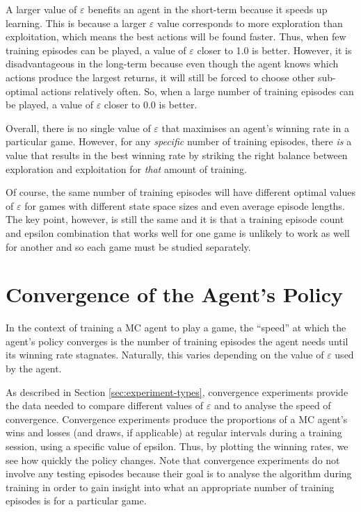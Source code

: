\documentclass[11pt,a4paper]{report}
\begin{document}
A larger value of $\varepsilon$ benefits an agent in the short-term because it speeds up learning. This is because a larger $\varepsilon$ value corresponds to more exploration than exploitation, which means the best actions will be found faster. Thus, when few training episodes can be played, a value of $\varepsilon$ closer to 1.0 is better. However, it is disadvantageous in the long-term because even though the agent knows which actions produce the largest returns, it will still be forced to choose other sub-optimal actions relatively often. So, when a large number of training episodes can be played, a value of $\varepsilon$ closer to 0.0 is better.

Overall, there is no single value of $\varepsilon$ that maximises an agent's winning rate in a particular game. However, for any \emph{specific} number of training episodes, there \emph{is} a value that results in the best winning rate by striking the right balance between exploration and exploitation for \emph{that} amount of training.

Of course, the same number of training episodes will have different optimal values of $\varepsilon$ for games with different state space sizes and even average episode lengths. The key point, however, is still the same and it is that a training episode count and epsilon combination that works well for one game is unlikely to work as well for another and so each game must be studied separately.


\section{Convergence of the Agent's Policy}
\label{sec:convergence-results}

In the context of training a MC agent to play a game, the ``speed'' at which the agent's policy converges is the number of training episodes the agent needs until its winning rate stagnates. Naturally, this varies depending on the value of $\varepsilon$ used by the agent.

As described in Section \ref{sec:experiment-types}, convergence experiments provide the data needed to compare different values of $\varepsilon$ and to analyse the speed of convergence. Convergence experiments produce the proportions of a MC agent's wins and losses (and draws, if applicable) at regular intervals during a training session, using a specific value of epsilon. Thus, by plotting the winning rates, we see how quickly the policy changes. Note that convergence experiments do not involve any testing episodes because their goal is to analyse the algorithm during training in order to gain insight into what an appropriate number of training episodes is for a particular game.
\end{document}
